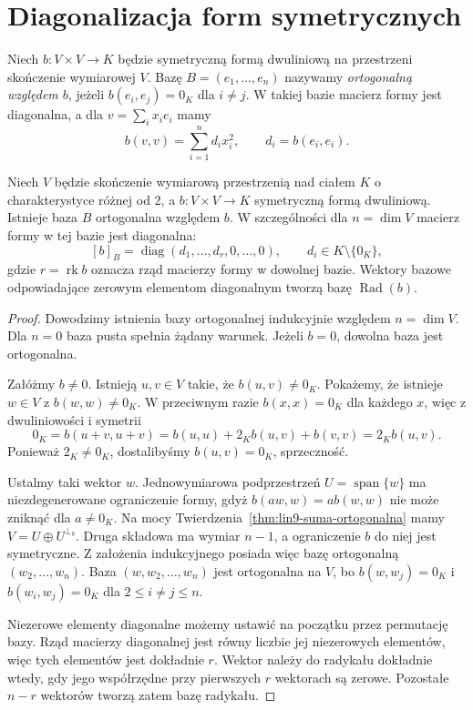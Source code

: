\section{Diagonalizacja form symetrycznych}
\label{sec:lin9-diagonalizacja}

\begin{definicja}
\label{def:lin9-baza-ortogonalna}
Niech \(b\colon V\times V\to K\)
będzie symetryczną formą
dwuliniową na przestrzeni
skończenie wymiarowej \(V\).
Bazę \(B=(e_1,\ldots,e_n)\)
nazywamy \emph{ortogonalną
względem \(b\)}, jeżeli
\(b(e_i,e_j)=0_K\) dla \(i\ne j\).
W takiej bazie macierz formy
jest diagonalna, a dla
\(v=\sum_i x_ie_i\) mamy
\[
 b(v,v)=\sum_{i=1}^n d_ix_i^2,
 \qquad d_i=b(e_i,e_i).
\]
\end{definicja}

\begin{twierdzenie}
\label{thm:lin9-diagonalizacja}
Niech \(V\) będzie skończenie
wymiarową przestrzenią nad
ciałem \(K\) o charakterystyce
różnej od \(2\), a
\(b\colon V\times V\to K\)
symetryczną formą dwuliniową.
Istnieje baza \(B\) ortogonalna
względem \(b\).
W szczególności dla
\(n=\dim V\) macierz formy
w tej bazie jest diagonalna:
\[
 [b]_B=\operatorname{diag}
 (d_1,\ldots,d_r,0,\ldots,0),
 \qquad d_i\in K\setminus\{0_K\},
\]
gdzie \(r=\operatorname{rk}b\)
oznacza rząd macierzy formy
w dowolnej bazie.
Wektory bazowe odpowiadające
zerowym elementom diagonalnym
tworzą bazę \(\operatorname{Rad}(b)\).
\end{twierdzenie}
\begin{proof}
Dowodzimy istnienia bazy
ortogonalnej indukcyjnie
względem \(n=\dim V\).
Dla \(n=0\) baza pusta
spełnia żądany warunek.
Jeżeli \(b=0\), dowolna
baza jest ortogonalna.

Załóżmy \(b\ne0\).
Istnieją \(u,v\in V\)
takie, że \(b(u,v)\ne0_K\).
Pokażemy, że istnieje
\(w\in V\) z \(b(w,w)\ne0_K\).
W przeciwnym razie
\(b(x,x)=0_K\) dla każdego \(x\),
więc z dwuliniowości i symetrii
\[
 0_K=b(u+v,u+v)
 =b(u,u)+2_Kb(u,v)+b(v,v)
 =2_Kb(u,v).
\]
Ponieważ \(2_K\ne0_K\),
dostalibyśmy \(b(u,v)=0_K\),
sprzeczność.

Ustalmy taki wektor \(w\).
Jednowymiarowa podprzestrzeń
\(U=\operatorname{span}\{w\}\)
ma niezdegenerowane
ograniczenie formy, gdyż
\(b(aw,w)=ab(w,w)\)
nie może zniknąć dla
\(a\ne0_K\).
Na mocy
Twierdzenia~\ref{thm:lin9-suma-ortogonalna}
mamy
\(V=U\oplus U^{\perp_b}\).
Druga składowa ma wymiar \(n-1\),
a ograniczenie \(b\) do niej
jest symetryczne.
Z założenia indukcyjnego
posiada więc bazę ortogonalną
\((w_2,\ldots,w_n)\).
Baza \((w,w_2,\ldots,w_n)\)
jest ortogonalna na \(V\),
bo \(b(w,w_j)=0_K\)
i \(b(w_i,w_j)=0_K\)
dla \(2\le i\ne j\le n\).

Niezerowe elementy diagonalne
możemy ustawić na początku
przez permutację bazy.
Rząd macierzy diagonalnej
jest równy liczbie jej
niezerowych elementów,
więc tych elementów jest
dokładnie \(r\).
Wektor należy do radykału
dokładnie wtedy, gdy jego
współrzędne przy pierwszych
\(r\) wektorach są zerowe.
Pozostałe \(n-r\)
wektorów tworzą zatem
bazę radykału.
\end{proof}

